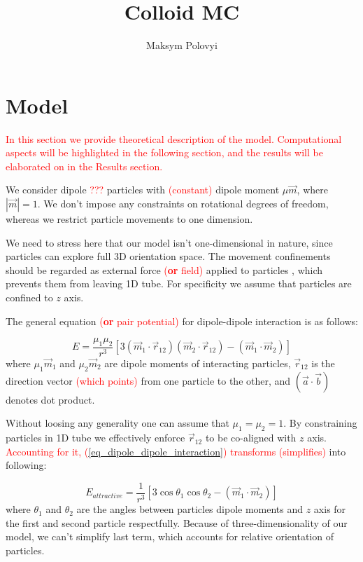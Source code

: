 \documentclass[12pt,a4paper]{article}
\author{Maksym Polovyi}
\title{Colloid MC}
\begin{document}
\section{Model}

\textcolor{red}{In this section we provide theoretical description of the model. Computational aspects will be highlighted in the following section, and the results will be elaborated on in the Results section.}

We consider dipole \textcolor{red}{???} particles with \textcolor{red}{(constant)} dipole moment $\mu \vec{m}$, where $|\vec{m}| = 1$. We don't impose any constraints on rotational degrees of freedom, whereas we restrict particle movements to one dimension.

We need to stress here that our model isn't one-dimensional in nature, since particles can explore full 3D orientation space. The movement confinements should be regarded as external force \textcolor{red}{(\textbf{or} field)} applied to particles , which prevents them from leaving 1D tube. For specificity we assume that particles are confined to $z$ axis.

The general equation \textcolor{red}{(\textbf{or} pair potential)} for dipole-dipole interaction is as follows:

\label{eq_dipole_dipole_interaction}
\begin{equation}
E = \frac{\mu_1 \mu_2}{r^3}[3 (\vec{m}_1 \cdot \vec{r}_{12})(\vec{m}_2 \cdot \vec{r}_{12}) - (\vec{m}_1 \cdot \vec{m}_2)]
\end{equation}
where $\mu_1\vec{m}_1$ and $\mu_2\vec{m}_2$ are dipole moments of interacting particles, $\vec{r}_{12}$ is the direction vector \textcolor{red}{(which points)} from one particle to the other, and $(\vec{a} \cdot \vec{b})$ denotes dot product.

Without loosing any generality one can assume that $\mu_1 = \mu_2 = 1$. By constraining particles in 1D tube we effectively enforce $\vec{r}_{12}$ to be co-aligned with $z$ axis. \textcolor{red}{Accounting for it, (\ref{eq_dipole_dipole_interaction}) transforms (simplifies)} into following:

\label{eq_dipole_dipole_1D}
\begin{equation}
E_{attractive} = \frac{1}{r^3} [3 \cos \theta_1 \cos \theta_2 - (\vec{m}_1 \cdot \vec{m}_2)]
\end{equation}
where $\theta_1$ and $\theta_2$ are the angles between particles dipole moments and $z$ axis for the first and second particle respectfully. Because of three-dimensionality of our model, we can't simplify last term, which accounts for relative orientation of particles.
\end{document}

